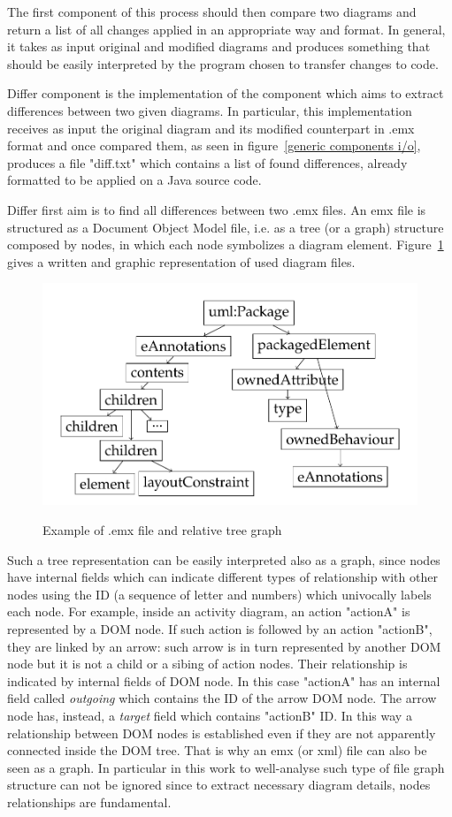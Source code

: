 The first component of this process should then compare two diagrams and return a list of all changes applied in an appropriate way and format. In general, it takes as input original and modified diagrams and produces something that should be easily interpreted by the program chosen to transfer changes to code.

Differ component is the implementation of the component which aims to extract differences between two given diagrams. In particular, this implementation receives as input the original diagram and its modified counterpart in .emx format and once compared them, as seen in figure~\ref{generic components i/o}, produces a file "diff.txt" which contains a list of found differences, already formatted to be applied on a Java source code. 

Differ first aim is to find all differences between two .emx files. An emx file is structured as a Document Object Model file, i.e. as a tree (or a graph) structure composed by nodes, in which each node symbolizes a diagram element. Figure~\ref{fig:DOMtree} gives a written and graphic representation of used diagram files.
\begin{figure}[htbp]
  \centering
  \includegraphics[width=.7\textwidth]{sample/figs/DOMtree}\\
  \vspace*{10pt}
\caption{Example of .emx file and relative tree graph}\label{fig:DOMtree}
\end{figure}
Such a tree representation can be easily interpreted also as a graph, since nodes have internal fields which can indicate different types of relationship with other nodes using the ID (a sequence of letter and numbers) which univocally labels each node. For example, inside an activity diagram, an action "actionA" is represented by a DOM node. If such action is followed by an action "actionB", they are linked by an arrow: such arrow is in turn represented by another DOM node but it is not a child or a sibing of action nodes. Their relationship is indicated by internal fields of DOM node. In this case "actionA" has an internal field called \textit{outgoing} which contains the ID of the arrow DOM node. The arrow node has, instead, a \textit{target} field which contains "actionB" ID. In this way a relationship between DOM nodes is established even if they are not apparently connected inside the DOM tree. That is why an emx (or xml) file can also be seen as a graph.
In particular in this work to well-analyse such type of file graph structure can not be ignored since to extract necessary diagram details, nodes relationships are fundamental.

